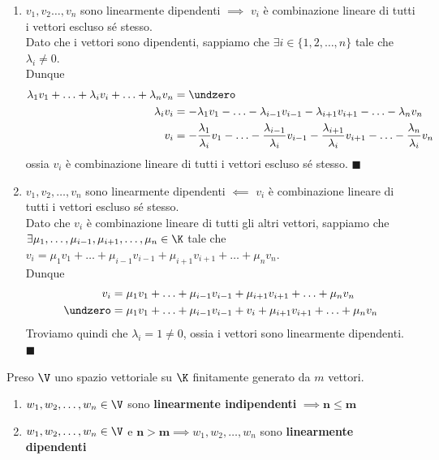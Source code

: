 \documentclass[11pt, a4paper, titlepage, oneside]{scrbook}
\begin{document}
\begin{enumerate}[label = \arabic*°]
    \item $v_1, v_2 \ldots, v_n$ sono linearmente dipendenti $\implies$ $v_i$ è combinazione lineare di tutti i vettori escluso sé stesso.\\
    Dato che i vettori sono dipendenti, sappiamo che $\exists i \in \{1, 2, \ldots, n\}$ tale che $\lambda_i \neq 0$. \\ 
    Dunque
    \begin{align*}
    \lambda_1 v_1 + \ldots + \lambda_i v_i + \ldots + \lambda_n v_n &= \undzero \\
    \lambda_i v_i &= - \lambda_1 v_1 - \ldots - \lambda_{i-1} v_{i-1} - \lambda_{i+1} v_{i+1} - \ldots - \lambda_n v_n \\
    v_i &= -\frac{\lambda_1}{\lambda_i}v_1 - \ldots - \frac{\lambda_{i-1}}{\lambda_i} v_{i-1} - \frac{\lambda_{i+1}}{\lambda_i} v_{i+1} - \ldots - \frac{\lambda_n}{\lambda_i} v_n
    \end{align*}
    ossia $v_i$ è combinazione lineare di tutti i  vettori escluso sé stesso. $\blacksquare$
    \item $v_1, v_2, \ldots, v_n$ sono linearmente dipendenti $\impliedby$ $v_i$ è combinazione lineare di tutti i vettori escluso sé stesso.\\
    Dato che $v_i$ è combinazione lineare di tutti gli altri vettori, sappiamo che \mbox{$\exists \mu_1, \ldots, \mu_{i-1}, \mu_{i+1}, \ldots, \mu_n \in \K$} tale che \mbox{$v_i = \mu_1 v_1 + \ldots + \mu_{i-1} v_{i-1} + \mu_{i+1} v_{i+1} + \ldots + \mu_n v_n$}. \\
    Dunque
    \begin{align*}
    v_i &= \mu_1 v_1 + \ldots + \mu_{i-1} v_{i-1} + \mu_{i+1} v_{i+1} + \ldots + \mu_n v_n  \\
    \undzero &= \mu_1 v_1 + \ldots + \mu_{i-1} v_{i-1} + v_i + \mu_{i+1} v_{i+1} + \ldots + \mu_n v_n 
    \end{align*}
    Troviamo quindi che $\lambda_i = 1 \neq 0$, ossia i vettori sono linearmente dipendenti. $\blacksquare$
\end{enumerate}

\begin{Proposizione}[]
\label{propos-rel-lin}
Preso $\V$ uno spazio vettoriale su $\K$ finitamente generato da $m$ vettori.
\begin{enumerate}
    \item $w_1, w_2, \ldots, w_n \in \V$ sono \textbf{linearmente indipendenti} $\implies \bm{n \leq m}$
    \item $w_1, w_2, \ldots, w_n \in \V$ e $\bm{n > m} \implies w_1, w_2, \ldots, w_n$ sono \textbf{linearmente dipendenti}
\end{enumerate}
\end{Proposizione}
\end{document}
